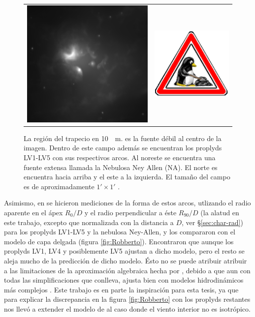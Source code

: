 \begin{figure}
  \begin{tabular}{lr}    \includegraphics[width=0.5\linewidth]{./Figures/Orion_Robberto}&\includegraphics[width=0.1\linewidth]{./Figures/tux-development}
  \end{tabular}
  \caption{La región del trapecio en \SI{10}{\mu m}. \thC{} es la fuente débil al centro de la imagen. Dentro de este campo además se encuentran los proplyds LV1-LV5 con sus respectivos arcos. Al noreste se encuentra una fuente extensa llamada la Nebulosa Ney Allen (NA). El norte es encuentra hacia arriba y el este a la izquierda. El tamaño del campo es de aproximadamente $1' \times 1'$ \citep{Robberto:2005}.}
\end{figure}

Asimismo, en \citet{Robberto:2005} se hicieron mediciones de la forma de estos arcos, utlizando el radio aparente en el ápex $R_0/D$ y el radio perpendicular a éste $R_{90}/D$ (la alatud en este trabajo, excepto que normalizada con la distancia a \thC{} $D$, ver \S \ref{sec:char-rad}) para los proplyds LV1-LV5 y la nebulosa Ney-Allen, y los compararon con el modelo de capa delgada \citep{Canto:1996} (figura \ref{fig:Robberto}). Encontraron que aunque los proplyds LV1, LV4 y posiblemente LV5 ajustan a dicho modelo, pero el resto se aleja mucho de la predicción de dicho modelo. Ésto no se puede atribuir atribuir a las limitaciones de la aproximación algebraica hecha por \citet{Canto:1996}, debido a que aun con todas las simplificaciones que conlleva, ajusta bien con modelos hidrodinámicos más complejos \citep{García-Arredondo:2001}. Este trabajo es en parte la inspiración para esta tesis, ya que para explicar la discrepancia en la figura \ref{fig:Robberto} con los proplyds restantes nos llevó a extender el modelo de \citet{Canto:1996} al caso donde el viento interior no es isotrópico.


